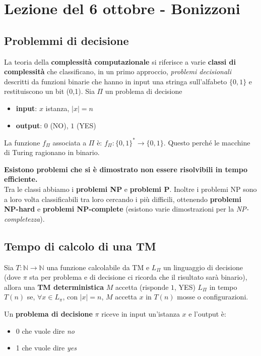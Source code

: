 \section{Lezione del 6 ottobre - Bonizzoni}
\subsection{Problemmi di decisione}
La teoria della \textbf{complessità computazionale} si riferisce a varie \textbf{classi di complessità} che classificano, in un primo approccio, \textit{problemi decisionali} descritti da funzioni binarie che hanno in input una stringa sull'alfabeto $\{0,1\}$ e restituiscono un bit (0,1). 
Sia $\Pi$ un problema di decisione 
\begin{itemize}
    \item \textbf{input}: $x$ istanza, $|x| = n$ 
    \item \textbf{output}: $0$ (NO), $1$ (YES)
\end{itemize} La funzione $f_{\Pi}$ associata a $\Pi$ è: $f_{\Pi} : \{0,1\}^* \to \{0,1\}$. Questo perché le macchine di Turing ragionano in binario. 

\textbf{Esistono problemi che si è dimostrato non essere risolvibili in tempo efficiente.}\\ Tra le classi abbiamo i \textbf{problemi NP} e \textbf{problemi P}. Inoltre i problemi NP sono a loro volta classificabili tra loro cercando i più difficili, ottenendo \textbf{problemi NP-hard} e \textbf{problemi NP-complete} (esistono varie dimostrazioni per la \textit{NP-completezza}). 

\subsection{Tempo di calcolo di una TM} 
 Sia $T:\mathbb{N} \to \mathbb{N}$ una funzione calcolabile da TM e $L_\Pi$ un linguaggio di decisione (dove $\pi$ sta per problema e di decisione ci ricorda che il risultato sarà binario), allora una \textbf{TM deterministica} $M$ accetta (risponde $1$, YES) $L_\Pi$ in tempo $T(n)$ se, $\forall x\in L_\pi$, con $|x|=n$, $M$ accetta $x$ in $T(n)$ mosse o configurazioni.
 
 Un \textbf{problema di decisione} $\pi$ riceve in input un'istanza $x$ e l'output è: 
 \begin{itemize} 
    \item 0 che vuole dire \textit{no} 
    \item 1 che vuole dire \textit{yes} 
\end{itemize} 

